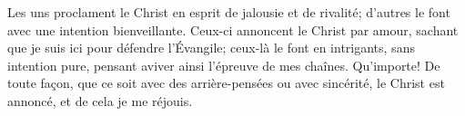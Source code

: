 Les uns proclament le Christ en esprit de jalousie et de rivalité;
	d’autres le font avec une intention bienveillante.
Ceux-ci annoncent le Christ par amour,
	sachant que je suis ici pour défendre l’Évangile;
	ceux-là le font en intrigants, sans intention pure,
	pensant aviver ainsi l’épreuve de mes chaînes.
Qu’importe! De toute façon, que ce soit avec des arrière-pensées ou avec sincérité,
	le Christ est annoncé, et de cela je me réjouis.
